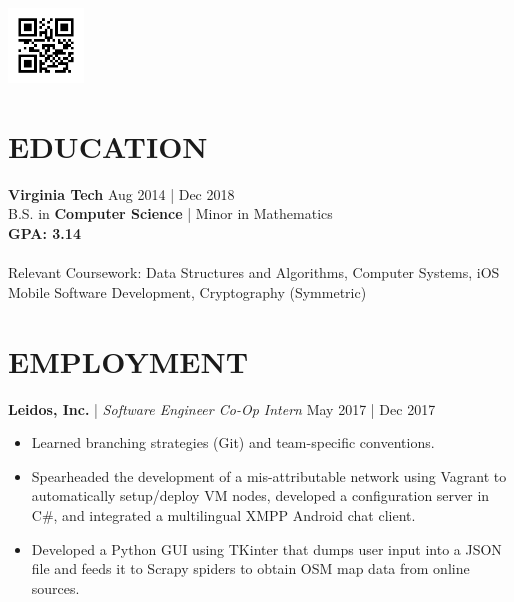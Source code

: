\documentclass[line,margin]{res}
\begin{document}
 \\ 
\includegraphics[width=2cm,height=2cm]{images/static_qr_code_without_logo.jpg} \\
\address{randy8@vt.edu | (571) 296-6786 | github.com/randy8 }
\begin{resume} 
	\vspace{-5mm}
	\section{EDUCATION}
	\textbf{Virginia Tech} \hfill Aug 2014 | Dec 2018\\ B.S. in \textbf{Computer Science} | Minor in Mathematics  \\ \textbf{GPA: 3.14} \\
	\\ Relevant Coursework: Data Structures and Algorithms, Computer Systems, iOS Mobile Software Development, Cryptography (Symmetric)
	\section{EMPLOYMENT}
	\textbf{Leidos, Inc.} | {\sl Software Engineer Co-Op Intern} \hfill May 2017 | Dec 2017 
	\begin{itemize} 
		\item Learned branching strategies (Git) and team-specific conventions.
		\item Spearheaded the development of a mis-attributable network  using Vagrant to automatically setup/deploy VM nodes, developed a configuration server in C\#, and integrated a multilingual XMPP Android chat client.
		\item Developed a Python GUI using TKinter that dumps user input into a JSON file and feeds it to Scrapy spiders to obtain OSM map data from online sources.
	\end{itemize}

\end{resume}
\end{document}
